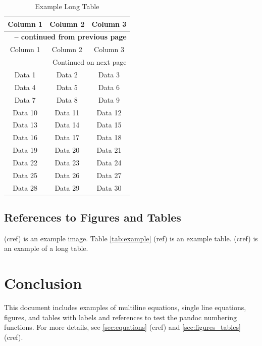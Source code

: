 \documentclass{article}
\begin{document}
\begin{longtable}{|c|c|c|}
    \caption{Example Long Table} \label{tab:longtable} \\
    \hline
    Column 1 & Column 2 & Column 3 \\
    \hline
    \endfirsthead
    \multicolumn{3}{c}{{\bfseries \tablename\ \thetable{} -- continued from previous page}} \\
    \hline
    Column 1 & Column 2 & Column 3 \\
    \hline
    \endhead
    \hline \multicolumn{3}{|r|}{{Continued on next page}} \\ \hline
    \endfoot
    \hline
    \endlastfoot
    Data 1 & Data 2 & Data 3 \\
    Data 4 & Data 5 & Data 6 \\
    Data 7 & Data 8 & Data 9 \\
    Data 10 & Data 11 & Data 12 \\
    Data 13 & Data 14 & Data 15 \\
    Data 16 & Data 17 & Data 18 \\
    Data 19 & Data 20 & Data 21 \\
    Data 22 & Data 23 & Data 24 \\
    Data 25 & Data 26 & Data 27 \\
    Data 28 & Data 29 & Data 30 \\
\end{longtable}

\subsection{References to Figures and Tables}
 (cref) is an example image. Table \ref{tab:example} (ref) is an example table.  (cref) is an example of a long table.

\section{Conclusion}
This document includes examples of multiline equations, single line equations, figures, and tables with labels and references to test the pandoc numbering functions. For more details, see \cref{sec:equations} (cref) and \cref{sec:figures_tables} (cref).
\end{document}
